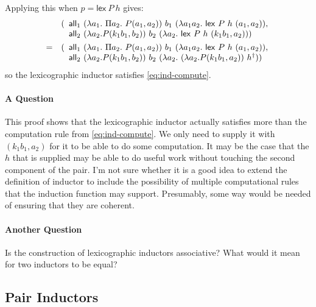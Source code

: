 \documentclass{article}
\begin{document}
Applying this when $p = \mathsf{lex}\ P\ h$ gives:
\begin{eqnarray*}
  & & (
  \begin{array}[t]{l}
    \all_1\ (\lambda a_1.\ \Pi a_2.\ P(a_1,a_2))\ b_1\ (\lambda a_1 a_2.\ \mathsf{lex}\ P\ h\ (a_1,a_2)), \\
    \all_2\ (\lambda a_2. P (k_1 b_1,b_2))\ b_2\ (\lambda a_2.\ \mathsf{lex}\ P\ h\ (k_1b_1,a_2)))
  \end{array}
  \\
  &=& (
  \begin{array}[t]{l}
    \all_1\ (\lambda a_1.\ \Pi a_2.\ P(a_1,a_2))\ b_1\ (\lambda a_1 a_2.\ \mathsf{lex}\ P\ h\ (a_1,a_2)), \\
    \all_2\ (\lambda a_2. P (k_1 b_1,b_2))\ b_2\ (\lambda a_2.\ (\lambda a_2. P(k_1 b_1, a_2))\ h^\dagger))
  \end{array}
\end{eqnarray*}
so the lexicographic inductor satisfies \autoref{eq:ind-compute}.

\paragraph{A Question} 
This proof shows that the lexicographic inductor actually satisfies
more than the computation rule from \autoref{eq:ind-compute}. We only
need to supply it with $(k_1b_1,a_2)$ for it to be able to do some
computation. It may be the case that the $h$ that is supplied may be
able to do useful work without touching the second component of the
pair. I'm not sure whether it is a good idea to extend the definition
of inductor to include the possibility of multiple computational rules
that the induction function may support. Presumably, some way would be
needed of ensuring that they are coherent.

\paragraph{Another Question} Is the construction of lexicographic
inductors associative? What would it mean for two inductors to be
equal?

\subsection{Pair Inductors}
\end{document}
